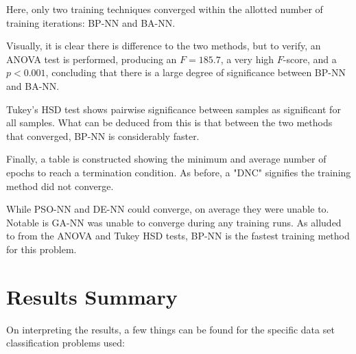 \documentclass[a4paper,12pt]{article}
\begin{document}
Here, only two training techniques converged within the allotted number of training iterations: BP-NN and BA-NN. 

Visually, it is clear there is difference to the two methods, but to verify, an ANOVA test is performed, producing an $F = 185.7$, a very high $F$-score, and a $p < 0.001$, concluding that there is a large degree of significance between BP-NN and BA-NN.

Tukey's HSD test shows pairwise significance between samples as significant for all samples. What can be deduced from this is that between the two methods that converged, BP-NN is considerably faster.

\begin{table}[h!]
\centering
{}
\caption{Minimum and average time to terminate for Ionosphere Radar set.}
\label{Tab:ionosphere-min}
\end{table}

Finally, a table is constructed showing the minimum and average number of epochs to reach a termination condition. As before, a "DNC" signifies the training method did not converge.

While PSO-NN and DE-NN could converge, on average they were unable to. Notable is GA-NN was unable to converge during any training runs. As alluded to from the ANOVA and Tukey HSD tests, BP-NN is the fastest training method for this problem.

\pagebreak

\section{Results Summary}

On interpreting the results, a few things can be found for the specific data set classification problems used:
\end{document}
